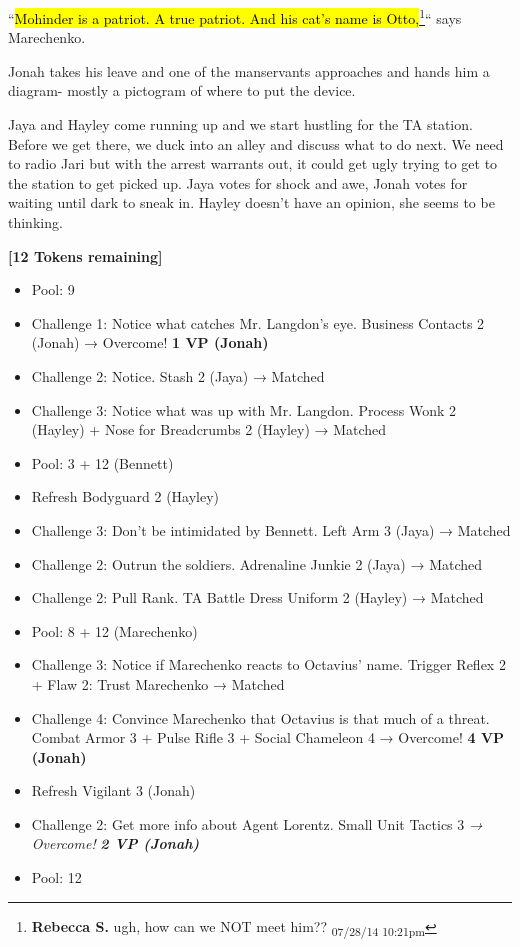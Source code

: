 ``\hl{Mohinder is a patriot.  A true patriot.  And his cat's name is Otto,}\footnote{\textbf{Rebecca S. }ugh, how can we NOT meet him?? \textsubscript{07/28/14 10:21pm}}`` says Marechenko.



Jonah takes his leave and one of the manservants approaches and hands him a diagram- mostly a pictogram of where to put the device.



Jaya and Hayley come running up and we start hustling for the TA station.  Before we get there, we duck into an alley and discuss what to do next.  We need to radio Jari but with the arrest warrants out, it could get ugly trying to get to the station to get picked up.  Jaya votes for shock and awe, Jonah votes for waiting until dark to sneak in.  Hayley doesn't have an opinion, she seems to be thinking.









\textbf{{[}12 Tokens remaining{]}}





\begin{itemize}
\item Pool: 9
\item Challenge 1:  Notice what catches Mr. Langdon's eye. Business Contacts 2 (Jonah) → Overcome! \textbf{1 VP (Jonah)}
\item Challenge 2:  Notice.  Stash 2 (Jaya) → Matched
\item Challenge 3: Notice what was up with Mr. Langdon.  Process Wonk 2 (Hayley) + Nose for Breadcrumbs 2 (Hayley) → Matched
\item Pool: 3 + 12 (Bennett)
\item Refresh Bodyguard 2 (Hayley)
\item Challenge 3: Don't be intimidated by Bennett.   Left Arm 3 (Jaya) → Matched
\item Challenge 2: Outrun the soldiers.  Adrenaline Junkie 2 (Jaya) → Matched
\item Challenge 2: Pull Rank.   TA Battle Dress Uniform 2 (Hayley) → Matched
\item Pool: 8 + 12 (Marechenko)
\item Challenge 3: Notice if Marechenko reacts to Octavius' name.  Trigger Reflex 2 +  {\color[RGB]{255,0,0}Flaw 2: Trust Marechenko}  → Matched
\item Challenge 4: Convince Marechenko that Octavius is that much of a threat.  Combat Armor 3 + Pulse Rifle 3 + Social Chameleon 4 → Overcome! \textbf{4 VP (Jonah)}
\item Refresh Vigilant 3 (Jonah)
\item Challenge 2: Get more info about Agent Lorentz.  Small Unit Tactics 3 \textit{→ Overcome! }\textit{\textbf{2 VP (Jonah)}}
\item Pool: 12
\end{itemize}




